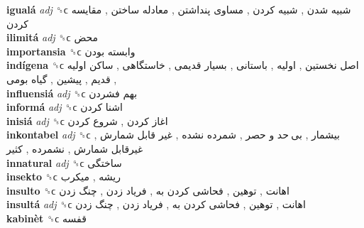 \textbf{igualá} \emph{adj}  ␝ϲ   شبیه شدن ,  شبیه کردن ,  مساوی پنداشتن ,  معادله ساختن ,  مقایسه کردن   \\
\textbf{ilimitá} \emph{adj}  ␝ϲ   محض   \\
\textbf{importansia} ␝ϲ   وابسته بودن   \\
\textbf{indígena} ␝ϲ   اصل نخستین ,  اولیه ,  باستانی ,  بسیار قدیمی ,  خاستگاهی ,  ساکن اولیه ,  قدیم ,  پیشین ,  گیاه بومی   \\
\textbf{influensiá} \emph{adj}  ␝ϲ   بهم فشردن   \\
\textbf{informá} \emph{adj}  ␝ϲ   اشنا کردن   \\
\textbf{inisiá} \emph{adj}  ␝ϲ   اغاز کردن ,  شروع کردن   \\
\textbf{inkontabel} \emph{adj}  ␝ϲ   بیشمار ,  بی حد و حصر ,  شمرده نشده ,  غیر قابل شمارش ,  غیرقابل شمارش ,  نشمرده ,  کثیر   \\
\textbf{innatural} \emph{adj}  ␝ϲ   ساختگی   \\
\textbf{insekto} ␝ϲ   ریشه ,  میکرب   \\
\textbf{insulto} ␝ϲ   اهانت ,  توهین ,  فحاشی کردن به ,  فریاد زدن ,  چنگ زدن   \\
\textbf{insultá} \emph{adj}  ␝ϲ   اهانت ,  توهین ,  فحاشی کردن به ,  فریاد زدن ,  چنگ زدن   \\
\textbf{kabinèt} ␝ϲ   قفسه   \\

